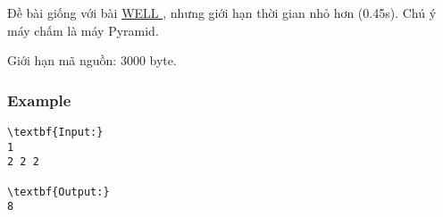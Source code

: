 

Đề bài giống với bài \href{http://vn.spoj.com/problems/WELL/}{ WELL } , nhưng giới hạn thời gian nhỏ hơn (0.45s). Chú ý máy chấm là máy Pyramid.

Giới hạn mã nguồn: 3000 byte.

\subsubsection{Example}
\begin{verbatim}
\textbf{Input:}
1
2 2 2

\textbf{Output:}
8
\end{verbatim}